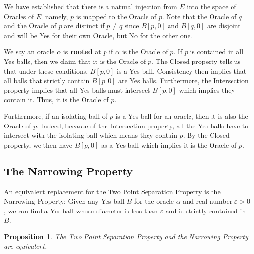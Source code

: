 \documentclass[12pt]{article}
\newtheorem{proposition}{Proposition}[section]
\begin{document}
We have established that there is a natural injection from $E$ into the space of Oracles of $E$, namely, $p$ is mapped to the Oracle of $p$. Note that the Oracle of $q$ and the Oracle of $p$ are distinct if $p \neq q$ since $B[p,0]$ and $B[q,0]$ are disjoint and will be Yes for their own Oracle, but No for the other one. 

We say an oracle $\alpha$ is \textbf{rooted} at $p$ if $\alpha$ is the Oracle of $p$. If $p$ is contained in all Yes balls, then we claim that it is the Oracle of $p$. The Closed property tells us that under these conditions, $B[p, 0]$ is a Yes-ball. Consistency then implies that all balls that strictly contain $B[p,0]$ are Yes balls. Furthermore, the Intersection property implies that all Yes-balls must intersect $B[p,0]$ which implies they contain it. Thus, it is the Oracle of $p$. 

Furthermore, if an isolating ball of $p$ is a Yes-ball for an oracle, then it is also the Oracle of $p$. Indeed, because of the Intersection property, all the Yes balls have to intersect with the isolating ball which means they contain $p$. By the Closed property, we then have $B[p,0]$ as a Yes ball which implies it is the Oracle of $p$. 


\subsection{The Narrowing Property}

An equivalent replacement for the Two Point Separation Property is the Narrowing Property: Given any Yes-ball $B$ for the oracle $\alpha$ and real number $\varepsilon >0$, we can find a Yes-ball whose diameter is less than $\varepsilon$ and is strictly contained in $B$.

\begin{proposition}
    The Two Point Separation Property and the Narrowing Property are equivalent.
\end{proposition}
\end{document}
